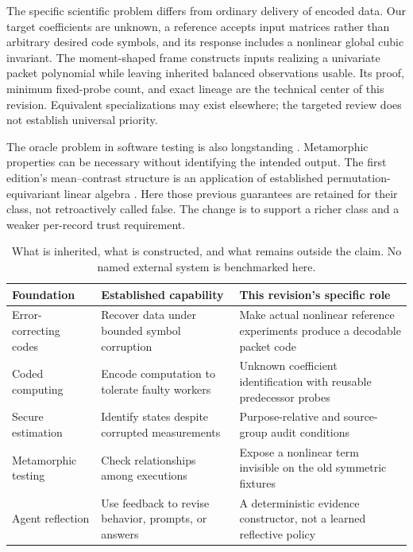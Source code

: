 \documentclass[11pt,letterpaper]{article}
\theoremstyle{remark}\newtheorem{remark}{Remark}[section]
\begin{document}
The specific scientific problem differs from ordinary delivery of encoded data. Our target coefficients are unknown, a reference accepts input matrices rather than arbitrary desired code symbols, and its response includes a nonlinear global cubic invariant. The moment-shaped frame constructs inputs realizing a univariate packet polynomial while leaving inherited balanced observations usable. Its proof, minimum fixed-probe count, and exact lineage are the technical center of this revision. Equivalent specializations may exist elsewhere; the targeted review does not establish universal priority.

The oracle problem in software testing is also longstanding \citep{oracle}. Metamorphic properties can be necessary without identifying the intended output. The first edition's mean--contrast structure is an application of established permutation-equivariant linear algebra \citep{deepsets,reflect1}. Here those previous guarantees are retained for their class, not retroactively called false. The change is to support a richer class and a weaker per-record trust requirement.

\begin{table}[htbp]\centering\small
\caption{What is inherited, what is constructed, and what remains outside the claim. No named external system is benchmarked here.}\label{tab:prior}
\begin{tabularx}{\linewidth}{@{}P{.23\linewidth}YY@{}}\toprule
Foundation & Established capability & This revision's specific role\\\midrule
Error-correcting codes & Recover data under bounded symbol corruption & Make actual nonlinear reference experiments produce a decodable packet code\\
Coded computing & Encode computation to tolerate faulty workers & Unknown coefficient identification with reusable predecessor probes\\
Secure estimation & Identify states despite corrupted measurements & Purpose-relative and source-group audit conditions\\
Metamorphic testing & Check relationships among executions & Expose a nonlinear term invisible on the old symmetric fixtures\\
Agent reflection & Use feedback to revise behavior, prompts, or answers & A deterministic evidence constructor, not a learned reflective policy\\\bottomrule
\end{tabularx}
\end{table}
\end{document}
